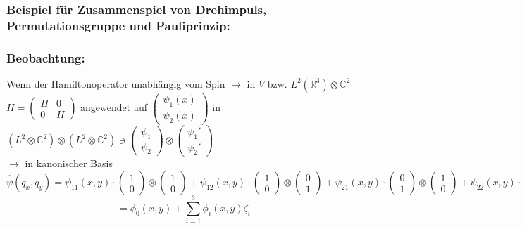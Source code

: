 \documentclass[twoside,a4paper]{scrartcl}
\newcommand{\R}{\mathbb{R}}
\newcommand{\C}{\mathbb{C}}
\renewcommand{\1}{\mathds{1}}
\newcommand{\ra}{\rightarrow}
\renewcommand{\R}{\mathbb{R}}
\renewcommand{\C}{\mathbb{C}}
\begin{document}
\subsubsection*{Beispiel für Zusammenspiel von Drehimpuls, Permutationsgruppe und Pauliprinzip:}
\subsubsection*{Beobachtung:}
Wenn der Hamiltonoperator unabhängig vom Spin $\ra$ in $V$ bzw. $L^2(\R^3)\otimes \C^2$\\
$\overline{H}=\begin{pmatrix}H & 0 \\ 0 & H \end{pmatrix}$ angewendet auf $\begin{pmatrix}\psi_1(x) \\ \psi_2(x) \end{pmatrix}$ in $(L^2\otimes \C^2)\otimes(L^2\otimes \C^2) \ni \begin{pmatrix}\psi_1 \\ \psi_2 \end{pmatrix} \otimes \begin{pmatrix}\psi_1' \\ \psi_2' \end{pmatrix}$\\
$\ra$ in kanonischer Basis
$$\hat \psi(q_x,q_y)=\psi_{11}(x,y)\cdot \begin{pmatrix}1 \\ 0 \end{pmatrix}\otimes \begin{pmatrix}1 \\ 0 \end{pmatrix}+\psi_{12}(x,y)\cdot \begin{pmatrix}1 \\ 0 \end{pmatrix}\otimes \begin{pmatrix}0 \\ 1 \end{pmatrix}+\psi_{21}(x,y)\cdot \begin{pmatrix}0 \\ 1 \end{pmatrix}\otimes \begin{pmatrix}1 \\ 0 \end{pmatrix}+\psi_{22}(x,y)\cdot\begin{pmatrix}0 \\ 1 \end{pmatrix}\otimes \begin{pmatrix}0 \\ 1 \end{pmatrix}$$
$$=\phi_0(x,y)+\sum_{i=1}^3 \phi_i(x,y)\zeta_i$$
\end{document}
